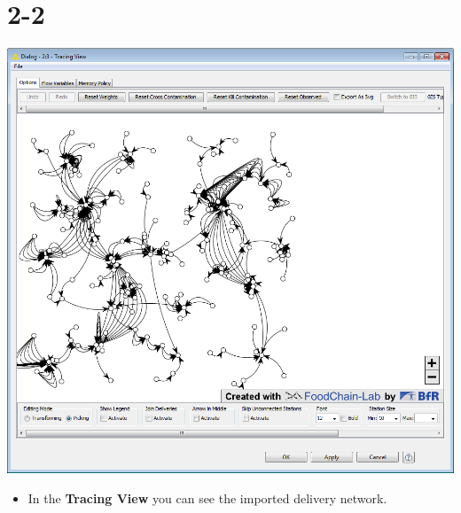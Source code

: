 \documentclass[10pt]{beamer}
\begin{document}
\section{2-2}
\begin{frame}
	\begin{center}
  		\includegraphics[height=0.6\textheight]{2-2.png}
	\end{center}
	\begin{itemize}
		\item In the \textbf{Tracing View} you can see the imported delivery network.
	\end{itemize}
\end{frame}
\end{document}
